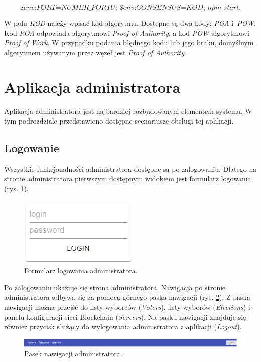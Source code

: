 \documentclass[a4paper,12pt]{book}
\begin{document}
\begin{equation}
	\textit{\$env:PORT=NUMER\_PORTU; \$env:CONSENSUS=KOD; npm start}.
\end{equation}

W polu \textit{KOD} należy wpisać kod algorytmu. Dostępne są dwa kody: \textit{POA} i~\textit{POW}. Kod \textit{POA} odpowiada algorytmowi \textit{Proof of Authority}, a kod \textit{POW} algorytmowi \textit{Proof of Work}. W przypadku podania błędnego kodu lub jego braku, domyślnym algorytmem używanym przez węzeł jest \textit{Proof of Authority}.

\section{Aplikacja administratora}

Aplikacja administratora jest najbardziej rozbudowanym elementem systemu. W tym podrozdziale przedstawiono dostępne scenariusze obsługi tej aplikacji.

\subsection{Logowanie}

Wszystkie funkcjonalności administratora dostępne są po zalogowaniu. Dlatego na stronie administratora pierwszym dostępnym widokiem jest formularz logowania (rys. \ref{adminlogin}).

\begin{figure}[h]
	\centering
	\includegraphics{images/adminlogin.png}
	\caption{Formularz logowania administratora.}\label{adminlogin}
\end {figure}

Po zalogowaniu ukazuje się strona administratora. Nawigacja po stronie administratora odbywa się za pomocą górnego paska nawigacji (rys. \ref{adminnav}). Z paska nawigacji można przejść do listy wyborców (\textit{Voters}), listy wyborów (\textit{Elections}) i panelu konfiguracji sieci Blockchain (\textit{Servers}). Na pasku nawigacji znajduje się również przycisk służący do wylogowania administratora z aplikacji (\textit{Logout}).

\begin{figure}[h]
	\centering
	\includegraphics[width=\textwidth]{images/adminnav.png}
	\caption{Pasek nawigacji administratora.}\label{adminnav}
\end {figure}
\end{document}
